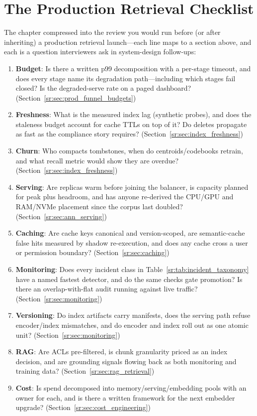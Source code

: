 \section{The Production Retrieval Checklist}
\label{sr:sec:prod_checklist}

The chapter compressed into the review you would run before (or after inheriting) a production retrieval launch---each line maps to a section above, and each is a question interviewers ask in system-design follow-ups:

\begin{enumerate}
    \item \textbf{Budget}: Is there a written p99 decomposition with a per-stage timeout, and does every stage name its degradation path---including which stages fail closed? Is the degraded-serve rate on a paged dashboard? (Section~\ref{sr:sec:prod_funnel_budgets})
    \item \textbf{Freshness}: What is the measured index lag (synthetic probes), and does the staleness budget account for cache TTLs on top of it? Do deletes propagate as fast as the compliance story requires? (Section~\ref{sr:sec:index_freshness})
    \item \textbf{Churn}: Who compacts tombstones, when do centroids/codebooks retrain, and what recall metric would show they are overdue? (Section~\ref{sr:sec:index_freshness})
    \item \textbf{Serving}: Are replicas warm before joining the balancer, is capacity planned for peak plus headroom, and has anyone re-derived the CPU/GPU and RAM/NVMe placement since the corpus last doubled? (Section~\ref{sr:sec:ann_serving})
    \item \textbf{Caching}: Are cache keys canonical and version-scoped, are semantic-cache false hits measured by shadow re-execution, and does any cache cross a user or permission boundary? (Section~\ref{sr:sec:caching})
    \item \textbf{Monitoring}: Does every incident class in Table~\ref{sr:tab:incident_taxonomy} have a named fastest detector, and do the same checks gate promotion? Is there an overlap-with-flat audit running against live traffic? (Section~\ref{sr:sec:monitoring})
    \item \textbf{Versioning}: Do index artifacts carry manifests, does the serving path refuse encoder/index mismatches, and do encoder and index roll out as one atomic unit? (Section~\ref{sr:sec:monitoring})
    \item \textbf{RAG}: Are ACLs pre-filtered, is chunk granularity priced as an index decision, and are grounding signals flowing back as both monitoring and training data? (Section~\ref{sr:sec:rag_retrieval})
    \item \textbf{Cost}: Is spend decomposed into memory/serving/embedding pools with an owner for each, and is there a written framework for the next embedder upgrade? (Section~\ref{sr:sec:cost_engineering})
\end{enumerate}

